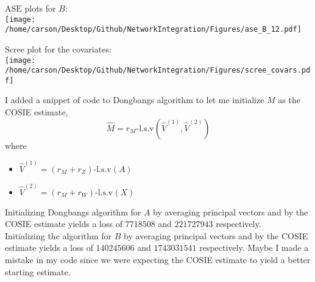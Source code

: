 \documentclass[notheorems]{beamer}
\theoremstyle{definition}
\begin{document}
\begin{frame}
$\text{ASE}$ plots for $B$:\\
\texttt{[image: /home/carson/Desktop/Github/NetworkIntegration/Figures/ase\_B\_12.pdf]}
\end{frame}





















\begin{frame}
Scree plot for the covariates:\\
\texttt{[image: /home/carson/Desktop/Github/NetworkIntegration/Figures/scree\_covars.pdf]}
\end{frame}

















\begin{frame}
I added a snippet of code to Dongbangs algorithm to let me initialize $M$ as the COSIE estimate, $$\hat{M} = r_M \text{-l.s.v}(\hat{V}^{(1)}, \hat{V}^{(2)})$$ where 
\begin{itemize}
\item $\hat{V}^{(1)} = \text{$(r_M + r_Z)$-l.s.v}(A)$ 
\item $\hat{V}^{(2)} = \text{$(r_M + r_W)$-l.s.v}(X)$
\end{itemize}
\end{frame}

















\begin{frame}
Initializing Dongbangs algorithm for $A$ by averaging principal vectors and by the COSIE estimate yields a loss of  $7718508$ and $221727943$ respectively.\\

Initializing the algorithm for $B$ by averaging principal vectors and by the COSIE estimate yields a loss of  $140245606$ and $1743031541$ respectively. Maybe I made a mistake in my code since we were expecting the COSIE estimate to yield a better starting estimate. 
\end{frame}















%
\end{document}
